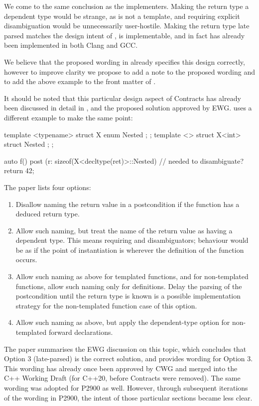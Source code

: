 We come to the same conclusion as the implementers. Making the return type a dependent type would be strange, as  is not a template, and requiring explicit disambiguation would be unnecessarily user-hostile. Making the return type late parsed matches the design intent of \cite{P2900R10}, is implementable, and in fact has already been implemented in both Clang and GCC.

We believe that the proposed wording in \cite{P2900R10} already specifies this design correctly, however to improve clarity we propose to add a note to the proposed wording and to add the above example to the front matter of \cite{P2900R10}.

It should be noted that this particular design aspect of Contracts has already been discussed in detail in \cite{P1323R2}, and the proposed solution approved by EWG. \cite{P1323R2} uses a different example to make the same point:
\begin{codeblock}
template <typename> struct X { enum { Nested }; };
template <> struct X<int>    { struct Nested {}; };

auto f()
post (r: sizeof(X<decltype(ret)>::Nested) {  //  needed to disambiguate?
  return 42;
}
\end{codeblock}
The paper lists four options:
\begin{enumerate}
\item Disallow naming the return value in a postcondition if the function has a deduced return type.
\item Allow such naming, but treat the name of the return value as having a dependent type. This means requiring  and  disambiguators; behaviour would be as if the point of instantiation is wherever the definition of the function occurs.
\item Allow such naming as above for templated functions, and for non-templated functions, allow such naming only for definitions. Delay the parsing of the postcondition until the return type is known is a possible implementation strategy for the non-templated function case of this option.
\item Allow such naming as above, but apply the dependent-type option for non-templated forward declarations.
\end{enumerate}
The paper summarises the EWG discussion on this topic, which concludes that Option 3 (late-parsed) is the correct solution, and provides wording for Option 3. This wording has already once been approved by CWG and merged into the C++ Working Draft (for C++20, before Contracts were removed). The same wording was adopted for P2900 as well. However, through subsequent iterations of the wording in P2900, the intent of those particular sections became less clear.

